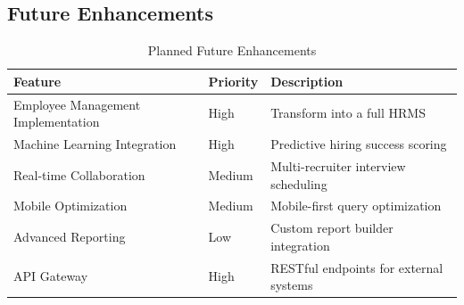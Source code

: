 \documentclass[11pt,a4paper]{article}
\begin{document}
\subsection{Future Enhancements}
\begin{table}[H]
    \centering
    \begin{tabular}{|l|l|p{7cm}|}
        \hline
        \rowcolor{tableheader}
        \textbf{Feature} & \textbf{Priority} & \textbf{Description} \\
        \hline
        Employee Management Implementation & High & Transform into a full HRMS \\
        \hline
        \hline
        Machine Learning Integration & High & Predictive hiring success scoring \\
        \hline
        Real-time Collaboration & Medium & Multi-recruiter interview scheduling \\
        \hline
        Mobile Optimization & Medium & Mobile-first query optimization \\
        \hline
        Advanced Reporting & Low & Custom report builder integration \\
        \hline
        API Gateway & High & RESTful endpoints for external systems \\
        \hline
    \end{tabular}
    \caption{Planned Future Enhancements}
\end{table}
\end{document}
